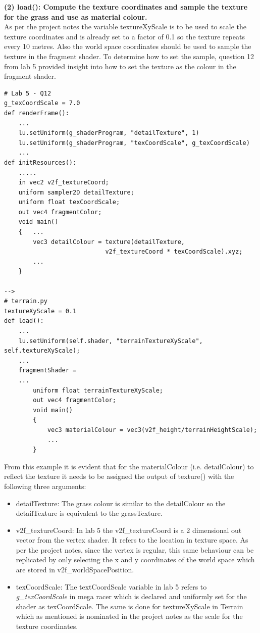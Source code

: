 \documentclass[a4 paper, 12pt]{article}
\begin{document}
\textbf{(2) load(): Compute the texture coordinates and sample the texture for the grass and use as material colour.} \\
As per the project notes the variable textureXyScale is to be used to scale the texture coordinates and is already set to a factor of 0.1 so the texture repeats every 10 metres. Also the world space coordinates should be used to sample the texture in the fragment shader. To determine how to set the sample, question 12 from lab 5 provided insight into how to set the texture as the colour in the fragment shader.
\begin{lstlisting}
# Lab 5 - Q12  
g_texCoordScale = 7.0
def renderFrame():
    ...
    lu.setUniform(g_shaderProgram, "detailTexture", 1)
    lu.setUniform(g_shaderProgram, "texCoordScale", g_texCoordScale)
    ...
def initResources():
    .....         
    in vec2 v2f_textureCoord;
    uniform sampler2D detailTexture; 
    uniform float texCoordScale; 
    out vec4 fragmentColor;
    void main() 
    {   ...     
        vec3 detailColour = texture(detailTexture, 
                            v2f_textureCoord * texCoordScale).xyz;      
        ...
    }   
   
-->
# terrain.py
textureXyScale = 0.1
def load():
    ...
    lu.setUniform(self.shader, "terrainTextureXyScale", self.textureXyScale);
    ...
    fragmentShader = 
    ...
        uniform float terrainTextureXyScale;
        out vec4 fragmentColor;
        void main()
        {
            vec3 materialColour = vec3(v2f_height/terrainHeightScale);
            ...
        }
\end{lstlisting}

From this example it is evident that for the materialColour (i.e. detailColour) to reflect the texture it needs to be assigned the output of texture() with the following three arguments:
    \begin{itemize}
        \item detailTexture: The grass colour is similar to the detailColour so the detailTexture is equivalent to the grassTexture.
        \item v2f\_textureCoord: In lab 5 the v2f\_textureCoord is a 2 dimensional out vector from the vertex shader. It refers to the location in texture space. As per the project notes, since the vertex is regular, this same behaviour can be replicated by only selecting the x and y coordinates of the world space which are stored in v2f\_worldSpacePosition.
        \item texCoordScale: The textCoordScale variable in lab 5 refers to \textit{g\_texCoordScale} in mega racer which is declared and uniformly set for the shader as texCoordScale. The same is done for textureXyScale in Terrain which as mentioned is nominated in the project notes as the scale for the texture coordinates.
    \end{itemize}
\end{document}
